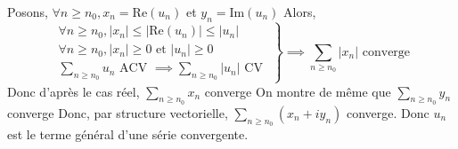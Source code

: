 \documentclass{article}
\renewenvironment{question_kholle}[2][ ]
{
	\subsection{\texorpdfstring{#2}{}}
	\notblank{#1}
	{
		\noindent #1
		\bigbreak
	}
	{}
	\begin{proof}
}
{
	\end{proof}
}
\begin{document}
\begin{question_kholle}
\begin{itemize}[label=$\lozenge$]
          Posons, $\forall n\geqslant n_{0}, x_{n} = \mathrm{Re}(u_{n})$ et $y_{n} = \mathrm{Im}(u_{n})$
          Alors,
          $$
            \left. \begin{array}{ll}
              \forall n \geqslant n_{0}, \lvert x_{n} \rvert \leqslant \lvert \mathrm{Re}(u_{n}) \rvert \leqslant \lvert u_{n} \rvert \\
              \forall n\geqslant n_{0}, \lvert  x_{n} \rvert \geqslant 0 \text{ et } \lvert u_{n} \rvert \geqslant 0                  \\
              \sum_{n\geqslant n_{0}}u_{n} \text{ ACV } \implies \sum_{n\geqslant n_{0}}\lvert u_{n} \rvert \text{ CV }
            \end{array}\right\}\implies \sum_{n\geqslant n_{0}}\lvert x_{n} \rvert \text{ converge}
          $$
          Donc d'après le cas réel, $\sum_{n\geqslant n_{0}} x_{n}$ converge
          On montre de même que $\sum_{n\geqslant n_{0}}y_{n}$ converge
          Donc, par structure vectorielle, $\sum_{n\geqslant n_{0}}(x_{n}+ iy_{n})$ converge.
          Donc $u_{n}$ est le terme général d'une série convergente.
  \end{itemize}
\end{question_kholle}
\end{document}
